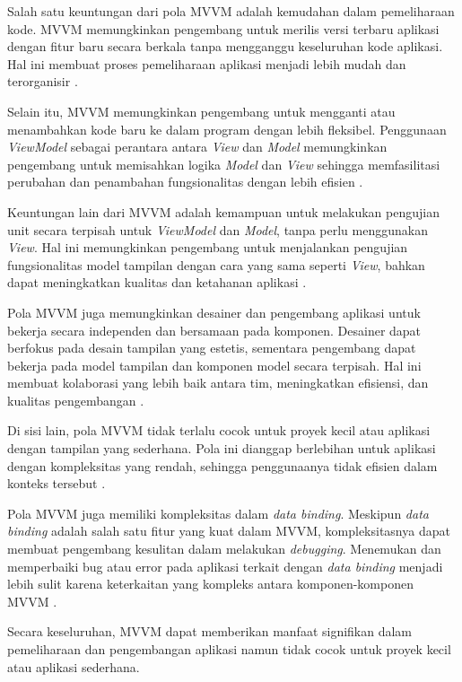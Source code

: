 \documentclass[conference]{IEEEtran}
\begin{document}
    Salah satu keuntungan dari pola MVVM adalah kemudahan dalam pemeliharaan kode. MVVM memungkinkan pengembang untuk merilis versi terbaru aplikasi dengan fitur baru secara berkala tanpa mengganggu keseluruhan kode aplikasi. Hal ini membuat proses pemeliharaan aplikasi menjadi lebih mudah dan terorganisir \cite{Martin2024}.

    Selain itu, MVVM memungkinkan pengembang untuk mengganti atau menambahkan kode baru ke dalam program dengan lebih fleksibel. Penggunaan \textit{ViewModel} sebagai perantara antara \textit{View} dan \textit{Model} memungkinkan pengembang untuk memisahkan logika \textit{Model} dan \textit{View} sehingga memfasilitasi perubahan dan penambahan fungsionalitas dengan lebih efisien \cite{michael2023}.

    Keuntungan lain dari MVVM adalah kemampuan untuk melakukan pengujian unit secara terpisah untuk \textit{ViewModel} dan \textit{Model}, tanpa perlu menggunakan \textit{View}. Hal ini memungkinkan pengembang untuk menjalankan pengujian fungsionalitas model tampilan dengan cara yang sama seperti \textit{View}, bahkan dapat meningkatkan kualitas dan ketahanan aplikasi \cite{michael2023}.

    Pola MVVM juga memungkinkan desainer dan pengembang aplikasi untuk bekerja secara independen dan bersamaan pada komponen. Desainer dapat berfokus pada desain tampilan yang estetis, sementara pengembang dapat bekerja pada model tampilan dan komponen model secara terpisah. Hal ini membuat kolaborasi yang lebih baik antara tim, meningkatkan efisiensi, dan kualitas pengembangan \cite{michael2023}. 
 
    Di sisi lain, pola MVVM tidak terlalu cocok untuk proyek kecil atau aplikasi dengan tampilan yang sederhana. Pola ini dianggap berlebihan untuk aplikasi dengan kompleksitas yang rendah, sehingga penggunaanya tidak efisien dalam konteks tersebut \cite{Maulana2022}.

    Pola MVVM juga memiliki kompleksitas dalam \textit{data binding}. Meskipun \textit{data binding} adalah salah satu fitur yang kuat dalam MVVM, kompleksitasnya dapat membuat pengembang kesulitan dalam melakukan \textit{debugging}. Menemukan dan memperbaiki bug atau error pada aplikasi terkait dengan \textit{data binding} menjadi lebih sulit karena keterkaitan yang kompleks antara komponen-komponen MVVM \cite{Maulana2022}.

    Secara keseluruhan, MVVM dapat memberikan manfaat signifikan dalam pemeliharaan dan pengembangan aplikasi namun tidak cocok untuk proyek kecil atau aplikasi sederhana.
	
\end{document}
